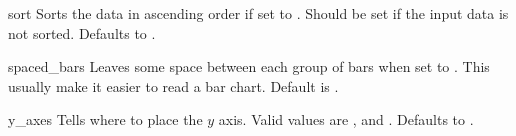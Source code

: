 \begin{AttrDecl}{sort}
Sorts the data in ascending order if set to . Should be set if
the input data is not sorted. Defaults to .
\end{AttrDecl}

\begin{AttrDecl}{spaced\_bars}
Leaves some space between each group of bars when set to . This
usually make it easier to read a bar chart. Default is .
\end{AttrDecl}

\begin{AttrDecl}{y\_axes}
Tells \thisclass where to place the $y$ axis. Valid
values are ,  and . Defaults
to .
\end{AttrDecl}
